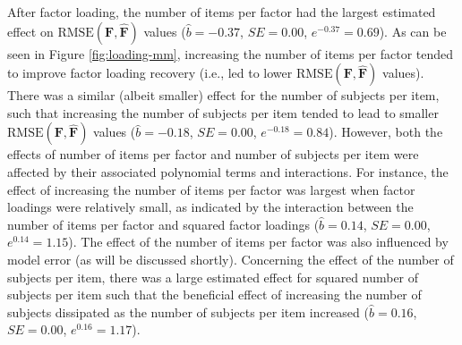 \documentclass[
  english,
  man]{apa6}
\begin{document}
After factor loading, the number of items per factor had the largest estimated effect on \(\textrm{RMSE}(\mathbf{F}, \hat{\mathbf{F}})\) values (\(\hat{b} = -0.37\), \(SE = 0.00\), \(e^{-0.37} = 0.69\)). As can be seen in Figure \ref{fig:loading-mm}, increasing the number of items per factor tended to improve factor loading recovery (i.e., led to lower \(\textrm{RMSE}(\mathbf{F}, \hat{\mathbf{F}})\) values). There was a similar (albeit smaller) effect for the number of subjects per item, such that increasing the number of subjects per item tended to lead to smaller \(\textrm{RMSE}(\mathbf{F}, \hat{\mathbf{F}})\) values (\(\hat{b} = -0.18\), \(SE = 0.00\), \(e^{-0.18} = 0.84\)). However, both the effects of number of items per factor and number of subjects per item were affected by their associated polynomial terms and interactions. For instance, the effect of increasing the number of items per factor was largest when factor loadings were relatively small, as indicated by the interaction between the number of items per factor and squared factor loadings (\(\hat{b} = 0.14\), \(SE = 0.00\), \(e^{0.14} = 1.15\)). The effect of the number of items per factor was also influenced by model error (as will be discussed shortly). Concerning the effect of the number of subjects per item, there was a large estimated effect for squared number of subjects per item such that the beneficial effect of increasing the number of subjects dissipated as the number of subjects per item increased (\(\hat{b} = 0.16\), \(SE = 0.00\), \(e^{0.16} = 1.17\)).
\end{document}
